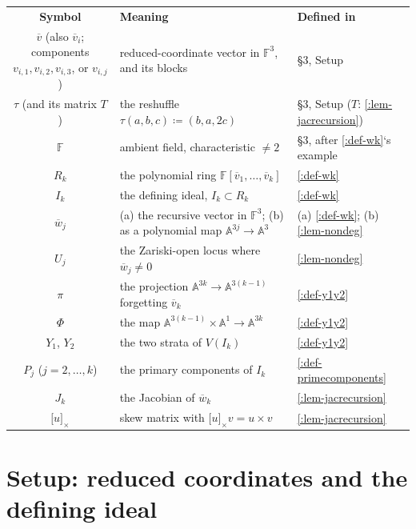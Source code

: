\documentclass[a4paper,11pt]{scrartcl}
\begin{document}
\begin{longtable}[]{@{}cll@{}}
\toprule\noalign{}
\endhead
\bottomrule\noalign{}
\endlastfoot
\textbf{Symbol} & \textbf{Meaning} & \textbf{Defined in} \\
\(\overline{v}\) (also \({\overline{v}}_{i}\); components \(v_{i,1},v_{i,2},v_{i,3}\), or \(v_{i,j}\)) & reduced-coordinate vector in \(\mathbb{F}^{3}\), and its blocks & §3, Setup \\
\(\tau\) (and its matrix \(T\)) & the reshuffle \(\tau(a,b,c) ≔ (b,a,2c)\) & §3, Setup (\(T\): \cref{:lem-jacrecursion}) \\
\(\mathbb{F}\) & ambient field, characteristic \(\neq 2\) & §3, after \cref{:def-wk}`s example \\
\(R_{k}\) & the polynomial ring \(\mathbb{F}\left\lbrack {\overline{v}}_{1},\ldots,{\overline{v}}_{k} \right\rbrack\) & \cref{:def-wk} \\
\(I_{k}\) & the defining ideal, \(I_{k} \subset R_{k}\) & \cref{:def-wk} \\
\({\overline{w}}_{j}\) & (a) the recursive vector in \(\mathbb{F}^{3}\); (b) as a polynomial map \(\mathbb{A}^{3j} \rightarrow \mathbb{A}^{3}\) & (a) \cref{:def-wk}; (b) \cref{:lem-nondeg} \\
\(U_{j}\) & the Zariski-open locus where \({\overline{w}}_{j} \neq 0\) & \cref{:lem-nondeg} \\
\(\pi\) & the projection \(\mathbb{A}^{3k} \rightarrow \mathbb{A}^{3(k - 1)}\) forgetting \({\overline{v}}_{k}\) & \cref{:def-y1y2} \\
\(\Phi\) & the map \(\mathbb{A}^{3(k - 1)} \times \mathbb{A}^{1} \rightarrow \mathbb{A}^{3k}\) & \cref{:def-y1y2} \\
\(Y_{1}\), \(Y_{2}\) & the two strata of \(V\left( I_{k} \right)\) & \cref{:def-y1y2} \\
\(P_{j}\) (\(j = 2,\ldots,k\)) & the primary components of \(I_{k}\) & \cref{:def-primecomponents} \\
\(J_{k}\) & the Jacobian of \({\overline{w}}_{k}\) & \cref{:lem-jacrecursion} \\
\(\lbrack u\rbrack_{\times}\) & skew matrix with \(\lbrack u\rbrack_{\times}v = u \times v\) & \cref{:lem-jacrecursion} \\
\end{longtable}

\section{Setup: reduced coordinates and the defining ideal}
\end{document}
